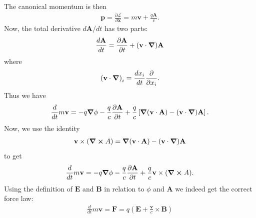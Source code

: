 \documentclass{book}
\theoremstyle{definition}
\newcommand{\p}{\partial}
\newcommand{\lag}{\mathcal{L}}
\newcommand{\f}[2]{\frac{#1}{#2}}
\newcommand{\lp}{\left(}
\newcommand{\rp}{\right)}
\newcommand{\lb}{\left[}
\newcommand{\rb}{\right]}
\begin{document}
The canonical momentum is then
\begin{align}
\mathbf{p} = \f{\p \lag}{\p \dot{\mathbf{x}}} = m\mathbf{v} + \f{q\mathbf{A}}{c}. 
\end{align}
Now, the total derivative $d\mathbf{A}/dt$ has two parts:
\begin{align}
\f{d\mathbf{A}}{dt} = \f{\p \mathbf{A}}{\p t} + (\mathbf{v}\cdot \grad)\mathbf{A} 
\end{align}
where
\begin{align}
\lp\mathbf{v}\cdot\grad\rp_i = \f{dx_i}{dt}\f{\p}{\p x_i}.
\end{align}
Thus we have
\begin{align}
\f{d}{dt}m\mathbf{v} = -q\grad{\phi} - \f{q}{c}\f{\p \mathbf{A}}{\p t} + \f{q}{c}\lb \grad{(\mathbf{v}\cdot \mathbf{A})} - (\mathbf{v}\cdot \grad)\mathbf{A} \rb.
\end{align}
Now, we use the identity
\begin{align}
\mathbf{v}\times (\curl{A}) = \grad{(\mathbf{v}\cdot \mathbf{A})} - (\mathbf{v}\cdot \grad)\mathbf{A}
\end{align}
to get
\begin{align}
\f{d}{dt}m\mathbf{v} = -q\grad{\phi} - \f{q}{c}\f{\p \mathbf{A}}{\p t} + \f{q}{c}\mathbf{v}\times (\curl{A}).
\end{align}
Using the definition of $\mathbf{E}$ and $\mathbf{B}$ in relation to $\phi$ and $\mathbf{A}$ we indeed get the correct force law:
\begin{align}
\f{d}{dt}m\mathbf{v} = \mathbf{F} = q\lp \mathbf{E} + \f{\mathbf{v}}{c}\times\mathbf{B} \rp
\end{align}
\end{document}
